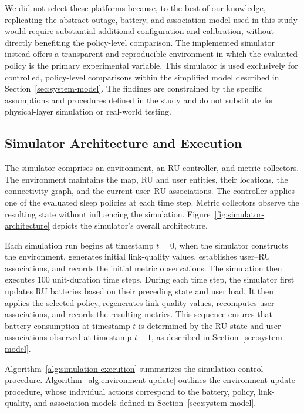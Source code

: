 We did not select these platforms because, to the best of our knowledge, replicating the abstract outage, battery, and association model used in this study would require substantial additional configuration and calibration, without directly benefiting the policy-level comparison. The implemented simulator instead offers a transparent and reproducible environment in which the evaluated policy is the primary experimental variable. This simulator is used exclusively for controlled, policy-level comparisons within the simplified model described in Section~\ref{sec:system-model}. The findings are constrained by the specific assumptions and procedures defined in the study and do not substitute for physical-layer simulation or real-world testing.

\subsection{Simulator Architecture and Execution}
\label{subsec:simulation-architecture}

The simulator comprises an environment, an RU controller, and metric collectors. The environment maintains the map, RU and user entities, their locations, the connectivity graph, and the current user--RU associations. The controller applies one of the evaluated sleep policies at each time step. Metric collectors observe the resulting state without influencing the simulation. Figure~\ref{fig:simulator-architecture} depicts the simulator's overall architecture.

Each simulation run begins at timestamp \(t=0\), when the simulator constructs the environment, generates initial link-quality values, establishes user--RU associations, and records the initial metric observations. The simulation then executes \(100\) unit-duration time steps. During each time step, the simulator first updates RU batteries based on their preceding state and user load. It then applies the selected policy, regenerates link-quality values, recomputes user associations, and records the resulting metrics. This sequence ensures that battery consumption at timestamp \(t\) is determined by the RU state and user associations observed at timestamp \(t-1\), as described in Section~\ref{sec:system-model}.

Algorithm~\ref{alg:simulation-execution} summarizes the simulation control procedure. Algorithm~\ref{alg:environment-update} outlines the environment-update procedure, whose individual actions correspond to the battery, policy, link-quality, and association models defined in Section~\ref{sec:system-model}.

